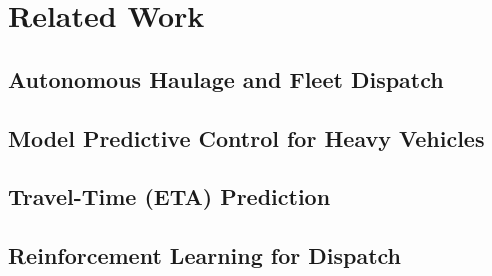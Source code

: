 \section{Related Work}

\subsection{Autonomous Haulage and Fleet Dispatch}

\subsection{Model Predictive Control for Heavy Vehicles}

\subsection{Travel-Time (ETA) Prediction}

\subsection{Reinforcement Learning for Dispatch}

